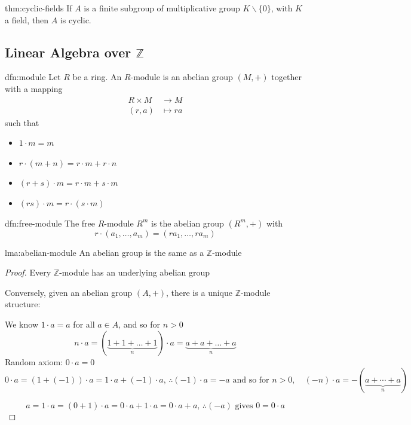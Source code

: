 \documentclass{article}
\begin{document}
\begin{thm}[]{thm:cyclic-fields}{}
    If $A$ is a finite subgroup of multiplicative group $K \backslash \{0\}$, with $K$ a field, then $A$ is cyclic.
\end{thm}

\newpage

\subsection{Linear Algebra over \texorpdfstring{$\mathbb{Z}$}{Z}}

\begin{dfn}[Module]{dfn:module}{}
    Let $R$ be a ring. An $R$-module is an abelian group $(M, +)$ together with a mapping
    \begin{align*}
        R \times M &\to M\\
        (r, a) &\mapsto ra
    \end{align*}
    such that
    \begin{multicols}{2}
    \begin{itemize}
        \item $1 \cdot m = m$
        \item $r \cdot (m + n) = r \cdot m + r \cdot n$
        \item $(r + s) \cdot m = r\cdot m + s\cdot m$
        \item $(rs) \cdot m = r \cdot (s \cdot m)$
    \end{itemize}
    \end{multicols}
\end{dfn}

\begin{dfn}{dfn:free-module}{}
    The free $R$-module $R^{m}$ is the abelian group $(R^{m}, +)$ with
    \[r \cdot (a_{1},\dots,a_{m}) = (ra_{1},\dots,ra_{m})\]
\end{dfn}

\begin{lma}{lma:abelian-module}{}
    An abelian group is the same as a $\mathbb{Z}$-module
\end{lma}

\begin{proof}
    Every $\mathbb{Z}$-module has an underlying abelian group

    Conversely, given an abelian group $(A, +)$, there is a unique $\mathbb{Z}$-module structure:

    We know $1 \cdot a = a$ for all $a\in A$, and so for $n > 0$
    \[n \cdot a = (\underbrace{1 + 1 + \dots + 1}_{n}) \cdot a = \underbrace{a + a + \dots + a}_{n}\]
    Random axiom: $0 \cdot a = 0$
    \[0 \cdot a = (1 + (-1)) \cdot a = 1 \cdot a + (-1) \cdot a ,\,\therefore (-1) \cdot a = -a \text{ and so for } n > 0, \quad (-n) \cdot a = -(\underbrace{a+\cdots+a}_{n})\]

    \[a = 1 \cdot a = (0 + 1) \cdot a = 0 \cdot a + 1 \cdot a = 0 \cdot a + a ,\,\therefore (-a) \text{ gives } 0 = 0 \cdot a\]
\end{proof}
\end{document}
